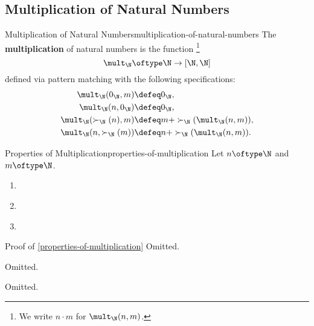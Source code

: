 \subsection{Multiplication of Natural Numbers}\label{subsection-multiplication-of-natural-numbers}
\begin{definition}{Multiplication of Natural Numbers}{multiplication-of-natural-numbers}%
    The \textbf{multiplication} of natural numbers is the function%
    \footnote{%
        We write $n\cdot m$ for $\mult_{\N}(n,m)$.
        \par\vspace*{\TCBBoxCorrection}
    }%
    \[
        \mult_{\N}%
        \oftype%
        \N%
        \to%
        [\N,\N]%
    \]%
    defined via pattern matching with the following specifications:%
    \begin{align*}
        \mult_{\N}(0_{\N},m)        &\defeq 0_{\N},\\
        \mult_{\N}(n,0_{\N})        &\defeq 0_{\N},\\
        \mult_{\N}(\succ_{\N}(n),m) &\defeq m+\succ_{\N}(\mult_{\N}(n,m)),\\%
        \mult_{\N}(n,\succ_{\N}(m)) &\defeq n+\succ_{\N}(\mult_{\N}(n,m)).%
    \end{align*}
\end{definition}
\begin{proposition}{Properties of Multiplication}{properties-of-multiplication}%
    Let $n\oftype\N$ and $m\oftype\N$.
    \begin{enumerate}
        \item\label{properties-of-multiplication-unitality}
        \item\label{properties-of-multiplication-associativity}
        \item\label{properties-of-multiplication-commutativity}
    \end{enumerate}
\end{proposition}
\begin{Proof}{Proof of \cref{properties-of-multiplication}}%
    Omitted.

    Omitted.

    Omitted.
\end{Proof}
